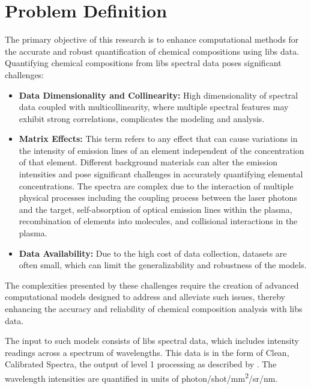 \section{Problem Definition}\label{sec:problem_definition}
The primary objective of this research is to enhance computational methods for the accurate and robust quantification of chemical compositions using \gls{libs} data.
Quantifying chemical compositions from \gls{libs} spectral data poses significant challenges:
\begin{itemize}
    \item \textbf{Data Dimensionality and Collinearity:} High dimensionality of spectral data coupled with multicollinearity, where multiple spectral features may exhibit strong correlations, complicates the modeling and analysis\cite{andersonImprovedAccuracyQuantitative2017}.
    \item \textbf{Matrix Effects:} This term refers to any effect that can cause variations in the intensity of emission lines of an element independent of the concentration of that element. Different background materials can alter the emission intensities and pose significant challenges in accurately quantifying elemental concentrations. The spectra are complex due to the interaction of multiple physical processes including the coupling process between the laser photons and the target, self-absorption of optical emission lines within the plasma, recombination of elements into molecules, and collisional interactions in the plasma\cite{cleggRecalibrationMarsScience2017, andersonImprovedAccuracyQuantitative2017}.
    \item \textbf{Data Availability:} Due to the high cost of data collection, datasets are often small, which can limit the generalizability and robustness of the models\cite{p9_paper}.
\end{itemize}

The complexities presented by these challenges require the creation of advanced computational models designed to address and alleviate such issues, thereby enhancing the accuracy and reliability of chemical composition analysis with \gls{libs} data.

The input to such models consists of \gls{libs} spectral data, which includes intensity readings across a spectrum of wavelengths.
This data is in the form of Clean, Calibrated Spectra\cite{andersonImprovedAccuracyQuantitative2017}, the output of level 1 processing as described by \citet{wiensPreflightCalibrationInitial2013}.
The wavelength intensities are quantified in units of photon/shot/mm\textsuperscript{2}/sr/nm.

